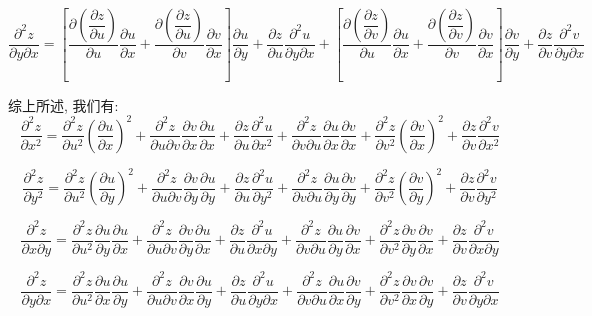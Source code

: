 \begin{definition}[链式法则]
	$$\dfrac{\partial^2 z}{\partial y\partial x}=\left[\dfrac{\partial (\dfrac{\partial z}{\partial u})}{\partial u}\dfrac{\partial u}{\partial x}+\dfrac{\partial (\dfrac{\partial z}{\partial u})}{\partial v}\dfrac{\partial v}{\partial x}\right]\frac{\partial u}{\partial y}+
	\dfrac{\partial z}{\partial u}\dfrac{\partial ^2u}{\partial y\partial x}+
	\left[\dfrac{\partial (\dfrac{\partial z}{\partial v})}{\partial u}\dfrac{\partial u}{\partial x}+\dfrac{\partial (\dfrac{\partial z}{\partial v})}{\partial v}\dfrac{\partial v}{\partial x}\right]\dfrac{\partial v}{\partial y}+
	\dfrac{\partial z}{\partial v}\dfrac{\partial ^2v}{\partial y\partial x}$$

	综上所述, 我们有:
	$$\dfrac{\partial^2 z}{\partial x^2}= \dfrac{\partial ^2z}{\partial u^{2}}(\dfrac{\partial u}{\partial x})^{2}+\dfrac{\partial^{2} z}{\partial u\partial v}\frac{\partial v}{\partial x}\frac{\partial u}{\partial x}+\dfrac{\partial z}{\partial u}\frac{\partial ^2u}{\partial x^2}+
	\dfrac{\partial ^2z}{\partial v\partial u}\dfrac{\partial u}{\partial x}\dfrac{\partial v}{\partial x}+\dfrac{\partial^{2} z}{\partial v^{2}}(\frac{\partial v}{\partial x})^{2}+\dfrac{\partial z}{\partial v}\dfrac{\partial^{2} v}{\partial x^{2}}$$

	$$\dfrac{\partial^2 z}{\partial y^2}= \dfrac{\partial ^2z}{\partial u^{2}}(\dfrac{\partial u}{\partial y})^{2}+\dfrac{\partial^{2} z}{\partial u\partial v}\frac{\partial v}{\partial y}\frac{\partial u}{\partial y}+\dfrac{\partial z}{\partial u}\frac{\partial ^2u}{\partial y^2}+
	\dfrac{\partial ^2z}{\partial v\partial u}\dfrac{\partial u}{\partial y}\dfrac{\partial v}{\partial y}+\dfrac{\partial^{2} z}{\partial v^{2}}(\frac{\partial v}{\partial y})^{2}+\dfrac{\partial z}{\partial v}\dfrac{\partial^{2} v}{\partial y^{2}}$$
	
	$$\dfrac{\partial^2 z}{\partial x\partial y}= \dfrac{\partial ^2z}{\partial u^{2}}\dfrac{\partial u}{\partial y}\dfrac{\partial u}{\partial x}+\dfrac{\partial^{2} z}{\partial u\partial v}\frac{\partial v}{\partial y}\frac{\partial u}{\partial x}+\dfrac{\partial z}{\partial u}\frac{\partial ^2u}{\partial x\partial y}+
	\dfrac{\partial ^2z}{\partial v\partial u}\dfrac{\partial u}{\partial y}\dfrac{\partial v}{\partial x}+\dfrac{\partial^{2} z}{\partial v^{2}}\frac{\partial v}{\partial y}\frac{\partial v}{\partial x}+\dfrac{\partial z}{\partial v}\dfrac{\partial^{2} v}{\partial x\partial y}$$

	$$\dfrac{\partial^2 z}{\partial y\partial x}= \dfrac{\partial ^2z}{\partial u^{2}}\dfrac{\partial u}{\partial x}\dfrac{\partial u}{\partial y}+\dfrac{\partial^{2} z}{\partial u\partial v}\frac{\partial v}{\partial x}\frac{\partial u}{\partial y}+\dfrac{\partial z}{\partial u}\frac{\partial ^2u}{\partial y\partial x}+
	\dfrac{\partial ^2z}{\partial v\partial u}\dfrac{\partial u}{\partial x}\dfrac{\partial v}{\partial y}+\dfrac{\partial^{2} z}{\partial v^{2}}\frac{\partial v}{\partial x}\frac{\partial v}{\partial y}+\dfrac{\partial z}{\partial v}\dfrac{\partial^{2} v}{\partial y\partial x}$$
\end{definition}
